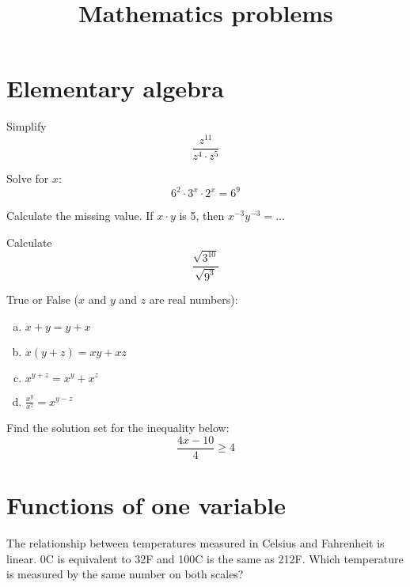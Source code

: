 \documentclass[10pt]{article}
\newenvironment{problem}[2][Problem]{\begin{trivlist}
\item[\hskip \labelsep {\bfseries #1}\hskip \labelsep {\bfseries #2.}]}{\end{trivlist}}
\begin{document}
 
\title{Mathematics problems}
\date{}
\maketitle

 \section{Elementary algebra}
 
\begin{problem}{1.1}
Simplify $$\frac{z^{11}}{z^4 \cdot z^5}$$
\end{problem}

\begin{problem}{1.2}
Solve for $x$:
$$6^2 \cdot 3^x \cdot 2^x = 6^9$$
\end{problem}

\begin{problem}{1.3}
Calculate the missing value. If $x \cdot y$ is 5, then $x^{-3}y^{-3}=\dots$
\end{problem}

\begin{problem}{1.4}
Calculate
$$\frac{\sqrt{3^{10}}}{\sqrt{9^3}}$$
\end{problem}

\begin{problem}{1.5}
True or False ($x$ and $y$ and $z$ are real numbers):
\begin{enumerate}[(a)]
    \item $x+y=y+x$
    \item $x(y+z)=xy+xz$
    \item $x^{y+z}=x^y+x^z$
    \item $\frac{x^y}{x^z}=x^{y-z}$
\end{enumerate}
\end{problem}

\begin{problem}{1.6}
Find the solution set for the inequality below:
$$\frac{4x-10}{4}\ge4$$
\end{problem}

\section{Functions of one variable}

\begin{problem}{2.1 (Based on SYD 2.5.6)}
The relationship between temperatures measured in Celsius and Fahrenheit is linear. 0\degree C is equivalent to 32\degree F and 100\degree C is the same as 212\degree F.
 Which temperature is measured by the same number on both scales?
\end{problem}
\end{document}
